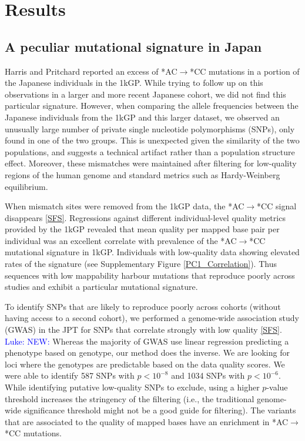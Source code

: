 \documentclass[9pt,lineno]{elife}
\newcommand{\luke}[1]{\textcolor{blue}{Luke: #1}}
\begin{document}
			\section{Results}
	\subsection{A peculiar mutational signature in Japan}			
	
Harris and Pritchard reported an excess of *AC${\rightarrow}$*CC mutations in a portion of the Japanese individuals in the 1kGP.\cite{Harris2015a}
While trying to follow up on this observations in a larger and more recent Japanese cohort, we did not find this particular signature.
However, when comparing the allele frequencies between the Japanese individuals from the 1kGP and this larger dataset, we observed an unusually large number of private single nucleotide polymorphisms (SNPs), only found in one of the two groups.
This is unexpected given the similarity of the two populations, and suggests a technical artifact rather than a population structure effect. 
Moreover, these mismatches were maintained after filtering for low-quality regions of the human genome and standard metrics such as Hardy-Weinberg equilibrium.

When mismatch sites were removed from the 1kGP data, the  *AC${\rightarrow}$*CC signal disappears \ref{SFS}.
Regressions against different individual-level quality metrics provided by the 1kGP revealed that mean quality per mapped base pair per individual was an excellent correlate with prevalence of the  *AC${\rightarrow}$*CC mutational signature in 1kGP. 
Individuals with low-quality data showing elevated rates of the signature (see Supplementary Figure \ref{PC1_Correlation}).
Thus sequences with low mappability harbour mutations that reproduce poorly across studies and exhibit a particular mutational signature. 

To identify SNPs that are likely to reproduce poorly across cohorts (without having access to a second cohort), we performed a genome-wide association study (GWAS) in the JPT for SNPs that correlate strongly with low quality \ref{SFS}.
\luke{NEW:} 
Whereas the majority of GWAS use linear regression predicting a phenotype based on genotype, our method does the inverse.
We are looking for loci where the genotypes are predictable based on the data quality scores.
We were able to identify 587 SNPs with $p < 10^{-8}$ and 1034 SNPs with $ p < 10^{-6}$.
While identifying putative low-quality SNPs to exclude, using a higher $p$-value threshold increases the stringency of the filtering (i.e., the traditional genome-wide significance threshold might not be a good guide for filtering).  
The variants that are associated to the quality of mapped bases have an enrichment in *AC${\rightarrow}$*CC mutations. 
\end{document}

